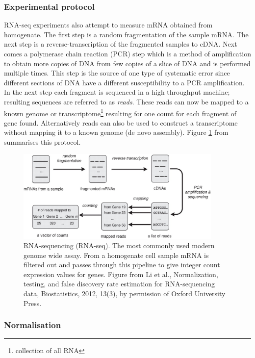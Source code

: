 \subsubsection{Experimental protocol}
\label{sec:technique-bio}

RNA-seq experiments also attempt to measure mRNA obtained from homogenate. The first step is a random fragmentation of the sample mRNA. The next step is a reverse-transcription of the fragmented samples to cDNA. Next comes a polymerase chain reaction (PCR) step which is a method of amplification to obtain more copies of DNA from few copies of a slice of DNA and is performed multiple times. This step is the source of one type of systematic error since different sections of  DNA have a different susceptibility to a PCR amplification. In the next step each fragment is sequenced in a high throughput machine; resulting sequences are referred to as \emph{reads}. These reads can now be mapped to a known genome or transcriptome\footnote{collection of all RNA} resulting for one count for each fragment of gene found.  Alternatively reads can also be used to construct a transcriptome without mapping it to a known genome (de novo assembly). Figure \ref{fig:li-biostats} from \cite{Li:2012ea} summarises this protocol.

\begin{figure}
  \centering
  \includegraphics[width=0.9\textwidth]{pics/li-biostats12.jpg}
  \caption{RNA-sequencing (RNA-seq). The most commonly used modern genome wide assay. From a homogenate cell sample mRNA is filtered out and passes through this pipeline to give integer count expression values for genes. Figure from Li et al., Normalization, testing, and false discovery rate estimation for RNA-sequencing data, Biostatistics, 2012, 13(3), by permission of Oxford University Press.}
  \label{fig:li-biostats}
\end{figure}

\subsubsection{Normalisation}
\label{sec:normalisation}

